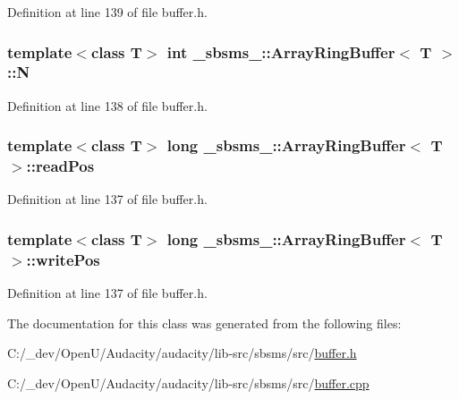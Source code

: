 Definition at line 139 of file buffer.\+h.

\subsubsection[{\texorpdfstring{N}{N}}]{\setlength{\rightskip}{0pt plus 5cm}template$<$class T$>$ {\bf int} {\bf \+\_\+sbsms\+\_\+\+::\+Array\+Ring\+Buffer}$<$ {\bf T} $>$\+::N}\hypertarget{class__sbsms___1_1_array_ring_buffer_aae8ab83bf76f0e11476f7859677c2c5b}{}\label{class__sbsms___1_1_array_ring_buffer_aae8ab83bf76f0e11476f7859677c2c5b}


Definition at line 138 of file buffer.\+h.

\subsubsection[{\texorpdfstring{read\+Pos}{readPos}}]{\setlength{\rightskip}{0pt plus 5cm}template$<$class T$>$ long {\bf \+\_\+sbsms\+\_\+\+::\+Array\+Ring\+Buffer}$<$ {\bf T} $>$\+::read\+Pos}\hypertarget{class__sbsms___1_1_array_ring_buffer_a3da6fb41e3943ed475c000caf8e89712}{}\label{class__sbsms___1_1_array_ring_buffer_a3da6fb41e3943ed475c000caf8e89712}


Definition at line 137 of file buffer.\+h.

\subsubsection[{\texorpdfstring{write\+Pos}{writePos}}]{\setlength{\rightskip}{0pt plus 5cm}template$<$class T$>$ long {\bf \+\_\+sbsms\+\_\+\+::\+Array\+Ring\+Buffer}$<$ {\bf T} $>$\+::write\+Pos}\hypertarget{class__sbsms___1_1_array_ring_buffer_a575d6c5414c4e4b5b7b884fc478184b1}{}\label{class__sbsms___1_1_array_ring_buffer_a575d6c5414c4e4b5b7b884fc478184b1}


Definition at line 137 of file buffer.\+h.



The documentation for this class was generated from the following files\+:\begin{DoxyCompactItemize}
\item 
C\+:/\+\_\+dev/\+Open\+U/\+Audacity/audacity/lib-\/src/sbsms/src/\hyperlink{sbsms_2src_2buffer_8h}{buffer.\+h}\item 
C\+:/\+\_\+dev/\+Open\+U/\+Audacity/audacity/lib-\/src/sbsms/src/\hyperlink{buffer_8cpp}{buffer.\+cpp}\end{DoxyCompactItemize}
